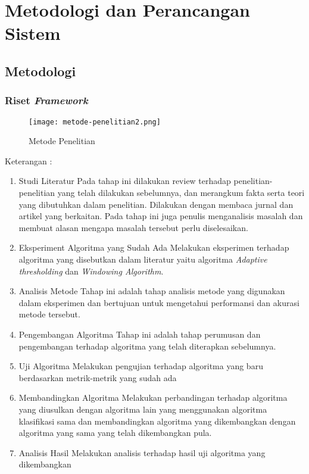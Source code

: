 \chapter{Metodologi dan Perancangan Sistem}
\section{Metodologi}
\subsection{Riset \textit{Framework}}
	\begin{figure}[h!]
		\centering
		\texttt{[image: metode-penelitian2.png]}
		\caption{Metode Penelitian}
		\label{fig:my_method}
	\end{figure}
	
	Keterangan : 
	\begin{enumerate}
	\item Studi Literatur
	 \subitem Pada tahap ini dilakukan review terhadap penelitian-penelitian yang telah dilakukan sebelumnya, dan merangkum fakta serta teori yang dibutuhkan dalam penelitian. Dilakukan dengan membaca jurnal dan artikel yang berkaitan. Pada tahap ini juga penulis menganalisis masalah dan membuat alasan mengapa masalah tersebut perlu diselesaikan.
	\item Eksperiment Algoritma yang Sudah Ada
	\subitem Melakukan eksperimen terhadap algoritma yang disebutkan dalam literatur yaitu algoritma \textit{Adaptive thresholding} dan \textit{Windowing Algorithm}.
	\item Analisis Metode
	\subitem Tahap ini adalah tahap analisis metode yang digunakan dalam eksperimen dan bertujuan untuk mengetahui performansi dan akurasi metode tersebut.
	\item Pengembangan Algoritma
	\subitem Tahap ini adalah tahap perumusan dan pengembangan terhadap algoritma yang telah diterapkan sebelumnya.
	\item Uji Algoritma
	\subitem Melakukan pengujian terhadap algoritma yang baru berdasarkan metrik-metrik yang sudah ada
	\item Membandingkan Algoritma
	\subitem Melakukan perbandingan terhadap algoritma yang diusulkan dengan algoritma lain yang menggunakan algoritma klasifikasi sama dan membandingkan algoritma yang dikembangkan dengan algoritma yang sama yang telah dikembangkan pula.
	\item Analisis Hasil
	\subitem Melakukan analisis terhadap hasil uji algoritma yang dikembangkan
	
	\end{enumerate}

